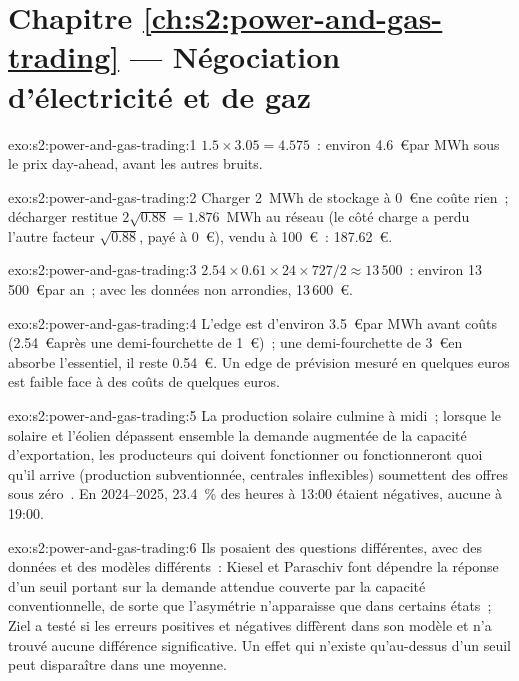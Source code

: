 \section*{Chapitre \ref{ch:s2:power-and-gas-trading} --- Négociation d'électricité et de gaz}

\begin{solution}{exo:s2:power-and-gas-trading:1}
$1.5 \times 3.05 = 4.575$~: environ 4.6~\euro par MWh sous le prix day-ahead, avant les autres bruits.
\end{solution}

\begin{solution}{exo:s2:power-and-gas-trading:2}
Charger 2~MWh de stockage à 0~\euro ne coûte rien~; décharger restitue $2\sqrt{0.88} = 1.876$~MWh au réseau (le côté charge a perdu l'autre
facteur $\sqrt{0.88}$, payé à 0~\euro), vendu à 100~\euro~: 187.62~\euro.
\end{solution}

\begin{solution}{exo:s2:power-and-gas-trading:3}
$2.54 \times 0.61 \times 24 \times 727 / 2 \approx 13\,500$~: environ 13\,500~\euro par an~; avec les données non arrondies, 13\,600~\euro.
\end{solution}

\begin{solution}{exo:s2:power-and-gas-trading:4}
L'edge est d'environ 3.5~\euro par MWh avant coûts (2.54~\euro après une demi-fourchette de 1~\euro)~; une demi-fourchette de 3~\euro en absorbe l'essentiel, il reste 0.54~\euro.
Un edge de prévision mesuré en quelques euros est faible face à des coûts de quelques euros.
\end{solution}

\begin{solution}{exo:s2:power-and-gas-trading:5}
La production solaire culmine à midi~; lorsque le solaire et l'éolien dépassent ensemble la demande augmentée de la capacité d'exportation, les producteurs qui doivent fonctionner ou fonctionneront quoi qu'il arrive (production subventionnée,
centrales inflexibles) soumettent des offres sous zéro~. En 2024--2025, 23.4~\% des heures à 13:00 étaient négatives, aucune à 19:00.
\end{solution}

\begin{solution}{exo:s2:power-and-gas-trading:6}
Ils posaient des questions différentes, avec des données et des modèles différents~: Kiesel et Paraschiv font dépendre la réponse d'un seuil portant sur la demande attendue
couverte par la capacité conventionnelle, de sorte que l'asymétrie n'apparaisse que dans certains états~; Ziel a testé si les erreurs positives et négatives diffèrent dans son
modèle et n'a trouvé aucune différence significative. Un effet qui n'existe qu'au-dessus d'un seuil peut disparaître dans une moyenne.
\end{solution}

